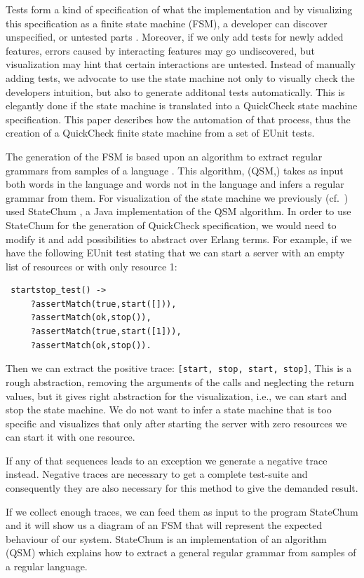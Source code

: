 \documentclass[]{sigplanconf}
\begin{document}
Tests form a kind of specification of what the implementation and by visualizing this specification as a finite state machine (FSM), a developer can discover unspecified, or untested parts  \cite{arts2010test}. Moreover, if we only add tests for newly added features, errors caused by interacting features may go undiscovered, but visualization may hint that certain interactions are untested. Instead of manually adding tests, we advocate to use the state machine not only to visually check the developers intuition, but also to generate additonal tests automatically. This is elegantly done if the state machine is translated into a QuickCheck state machine specification.
This paper describes how the automation of that process, thus the creation of a QuickCheck finite state machine from a set of EUnit tests.  

The generation of the FSM is based upon an algorithm to extract regular grammars from samples of a language \cite{dupont2008qsm}.
This algorithm, (QSM,) takes as input both words in the language and words not in the
language and infers a regular grammar from them. For visualization of the state machine we previously  (cf.\ \cite{arts2010test}) used StateChum \cite{statechum}, a Java implementation of the QSM algorithm. In order to use StateChum for the generation of QuickCheck specification, we would need to modify it and add possibilities to abstract over Erlang terms. 
For example, if we have the following EUnit test stating that we can start a server with an empty list of resources or with only resource 1:
\begin{verbatim}
 startstop_test() ->
     ?assertMatch(true,start([])),
     ?assertMatch(ok,stop()),
     ?assertMatch(true,start([1])),
     ?assertMatch(ok,stop()).
\end{verbatim}
Then we can extract the positive trace: \texttt{[start, stop, start, stop]}, This is a rough abstraction, removing the arguments of the calls and neglecting the return values, but it gives right abstraction for the visualization, i.e., we can start and stop the state machine. We do not want to infer a state machine that is too specific and visualizes that only after starting the server with zero resources we can start it with one resource. 

If any of that sequences leads to an exception we generate a negative trace instead.
Negative traces are necessary to get a complete test-suite and consequently they are
also necessary for this method to give the demanded result.

If we collect enough traces, we can feed them as input to the
program \mbox{StateChum\cite{statechum}} and it will show us a diagram
of an FSM that will represent the expected behaviour of our system.
StateChum is an implementation of an algorithm (QSM\cite{dupont2008qsm})
which explains how to extract a general regular grammar from samples
of a regular language.
\end{document}
